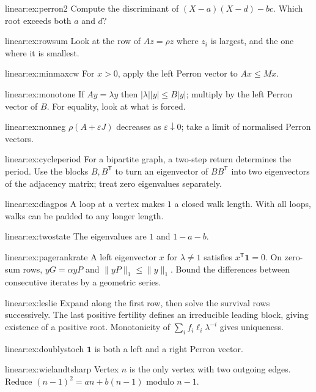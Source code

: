 \begin{hint}{linear:ex:perron2}
Compute the discriminant of $(X-a)(X-d)-bc$. Which root exceeds both $a$ and $d$?
\end{hint}
\begin{hint}{linear:ex:rowsum}
Look at the row of $Az=\rho z$ where $z_i$ is largest, and the one where it is smallest.
\end{hint}
\begin{hint}{linear:ex:minmaxcw}
For $x>0$, apply the left Perron vector to $Ax\le Mx$.
\end{hint}
\begin{hint}{linear:ex:monotone}
If $Ay=\lambda y$ then $|\lambda||y|\le B|y|$; multiply by the left Perron vector of $B$. For equality, look at what is forced.
\end{hint}
\begin{hint}{linear:ex:nonneg}
$\rho(A+\varepsilon J)$ decreases as $\varepsilon\downarrow0$; take a limit of normalised Perron vectors.
\end{hint}
\begin{hint}{linear:ex:cycleperiod}
For a bipartite graph, a two-step return determines the period. Use the blocks
$B,B^{\mathsf T}$ to turn an eigenvector of $BB^{\mathsf T}$ into two
eigenvectors of the adjacency matrix; treat zero eigenvalues separately.
\end{hint}
\begin{hint}{linear:ex:diagpos}
A loop at a vertex makes $1$ a closed walk length. With all loops, walks can be padded to any longer length.
\end{hint}
\begin{hint}{linear:ex:twostate}
The eigenvalues are $1$ and $1-a-b$.
\end{hint}
\begin{hint}{linear:ex:pagerankrate}
A left eigenvector $x$ for $\lambda\ne1$ satisfies $x^{\mathsf T}\mathbf 1=0$.
On zero-sum rows, $yG=\alpha yP$ and $\|yP\|_1\le\|y\|_1$.
Bound the differences between consecutive iterates by a geometric series.
\end{hint}
\begin{hint}{linear:ex:leslie}
Expand along the first row, then solve the survival rows successively.
The last positive fertility defines an irreducible leading block, giving
existence of a positive root. Monotonicity of $\sum_i f_i\ell_i\lambda^{-i}$
gives uniqueness.
\end{hint}
\begin{hint}{linear:ex:doublystoch}
$\mathbf 1$ is both a left and a right Perron vector.
\end{hint}
\begin{hint}{linear:ex:wielandtsharp}
Vertex $n$ is the only vertex with two outgoing edges. Reduce $(n-1)^2=an+b(n-1)$ modulo $n-1$.
\end{hint}

